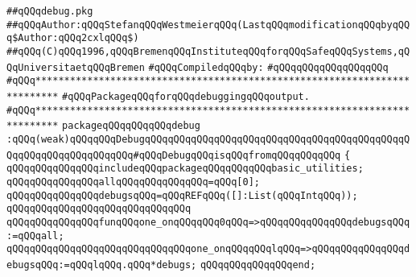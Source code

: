 \label{src/lib/tk/src/debug.pkg}
\verb|##qQQqdebug.pkg|\newline
\verb|##qQQqAuthor:qQQqStefanqQQqWestmeierqQQq(LastqQQqmodificationqQQqbyqQQq$Author:qQQq2cxlqQQq$)|\newline
\verb|##qQQq(C)qQQq1996,qQQqBremenqQQqInstituteqQQqforqQQqSafeqQQqSystems,qQQqUniversitaetqQQqBremen|\newline
\newline
\verb|#qQQqCompiledqQQqby:|\newline
\verb|#qQQqqQQqqQQqqQQqqQQq|\newline
\newline
\newline
\newline
\verb|#qQQq**************************************************************************|\newline
\verb|#qQQqPackageqQQqforqQQqdebuggingqQQqoutput.|\newline
\verb|#qQQq**************************************************************************|\newline
\newline
\newline
\newline
\verb|packageqQQqqQQqqQQqdebug|\newline
\verb|:qQQq(weak)qQQqqQQqDebugqQQqqQQqqQQqqQQqqQQqqQQqqQQqqQQqqQQqqQQqqQQqqQQqqQQqqQQqqQQqqQQqqQQq#qQQqDebugqQQqisqQQqfromqQQqqQQqqQQq|\newline
\verb|{|\newline
\verb|qQQqqQQqqQQqqQQqincludeqQQqpackageqQQqqQQqqQQqbasic_utilities;|\newline
\newline
\verb|qQQqqQQqqQQqqQQqallqQQqqQQqqQQqqQQq=qQQq[0];|\newline
\newline
\verb|qQQqqQQqqQQqqQQqdebugsqQQq=qQQqREFqQQq([]:List(qQQqIntqQQq));|\newline
\verb|qQQqqQQqqQQqqQQqqQQqqQQqqQQqqQQq|\newline
\verb|qQQqqQQqqQQqqQQqfunqQQqone_onqQQqqQQq0qQQq=>qQQqqQQqqQQqqQQqdebugsqQQq:=qQQqall;|\newline
\verb|qQQqqQQqqQQqqQQqqQQqqQQqqQQqqQQqone_onqQQqqQQqlqQQq=>qQQqqQQqqQQqqQQqdebugsqQQq:=qQQqlqQQq.qQQq*debugs;|\newline
\verb|qQQqqQQqqQQqqQQqend;|\newline
